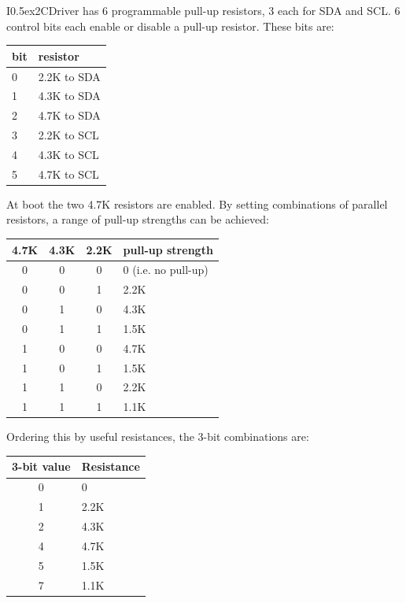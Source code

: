 \documentclass{article}
\newcommand{\two}{\raise0.5ex\hbox{\footnotesize{2}}}
\newcommand{\iicdriver}{I\two{}CDriver}
\newcommand{\gap}{\vspace{10pt}}
\begin{document}
\iicdriver{} has 6 programmable pull-up resistors, 3 each for SDA and SCL.
6 control bits each enable or disable a pull-up resistor. These bits are:

\gap
\begin{center}\begin{tabular}{ll}
\hline
bit & resistor \\
\hline
 0  & 2.2K to SDA \\
 1  & 4.3K to SDA \\
 2  & 4.7K to SDA \\
 3  & 2.2K to SCL \\
 4  & 4.3K to SCL \\
 5  & 4.7K to SCL \\
\hline
\end{tabular}\end{center}\gap

At boot the two 4.7K resistors are enabled.
By setting combinations of parallel resistors, a range of pull-up strengths can be achieved:

\gap
\begin{center}\begin{tabular}{cccl}
\hline
4.7K & 4.3K & 2.2K & pull-up strength \\
\hline
 0   &  0   &   0  & 0 (i.e. no pull-up) \\
 0   &  0   &   1  & 2.2K \\
 0   &  1   &   0  & 4.3K \\
 0   &  1   &   1  & 1.5K \\
 1   &  0   &   0  & 4.7K \\
 1   &  0   &   1  & 1.5K \\
 1   &  1   &   0  & 2.2K \\
 1   &  1   &   1  & 1.1K \\
\hline
\end{tabular}\end{center}\gap

Ordering this by useful resistances, the 3-bit combinations are:

\gap
\begin{center}\begin{tabular}{cl}
\hline
3-bit value & Resistance \\
\hline
  0         & 0 \\
  1         & 2.2K \\
  2         & 4.3K \\
  4         & 4.7K \\
  5         & 1.5K \\
  7         & 1.1K \\
\hline
\end{tabular}\end{center}\gap
\end{document}
